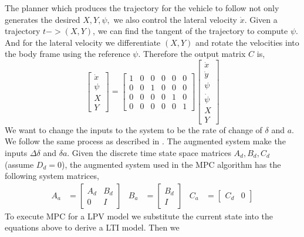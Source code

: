 \documentclass{article}
\begin{document}
The planner which produces the trajectory for the vehicle to follow not only generates the desired $X,Y,\psi,$ we also
control the lateral velocity $\dot{x}$. Given a trajectory $t -> (X, Y)$, we can find the tangent of the trajectory to
compute $\psi$. And for the lateral velocity we differentiate $(X, Y)$ and rotate the velocities into the body frame
using the reference $\psi$. Therefore the output matrix $C$ is,
\begin{equation}
    \begin{bmatrix} \dot{x} \\ \psi \\ X \\ Y \end{bmatrix}
    =
    \begin{bmatrix}
        1 & 0 & 0 & 0 & 0 & 0 \\
        0 & 0 & 1 & 0 & 0 & 0 \\
        0 & 0 & 0 & 0 & 1 & 0 \\
        0 & 0 & 0 & 0 & 0 & 1
    \end{bmatrix}
    \begin{bmatrix} \dot{x} \\ \dot{y} \\ \psi \\ \dot{\psi} \\ X \\ Y \end{bmatrix}
\end{equation}
We want to change the inputs to the system to be the rate of change of $\delta$ and $a$. We follow the same process as
described in . The augmented system make the inputs $\Delta\delta$ and $\delta a$. Given
the discrete time state space matrices $A_d, B_d, C_d$ (assume $D_d=0$), the augmented system used in the MPC algorithm
has the following system matrices,
\begin{align}
    A_a &= \begin{bmatrix} A_d & B_d \\ 0 & I \end{bmatrix} &
    B_a &= \begin{bmatrix} B_d \\ I \end{bmatrix} &
    C_a &= \begin{bmatrix} C_d & 0 \end{bmatrix}
\end{align}
To execute MPC for a LPV model we substitute the current state into the equations above to derive a LTI model. Then we
\end{document}
